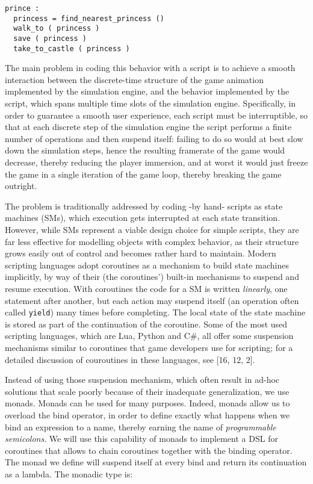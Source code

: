 \begin{lstlisting}
prince :
  princess = find_nearest_princess ()
  walk_to ( princess )
  save ( princess )
  take_to_castle ( princess )
\end{lstlisting}

The main problem in coding this behavior with a script is to achieve a smooth interaction between the discrete-time structure of the game animation implemented by the simulation engine, and the behavior implemented by the script, which spans multiple time slots of the simulation engine. Specifically, in order to guarantee a smooth user experience, each script must be interruptible, so that at each discrete step of the simulation engine the script performs a finite number of operations and then suspend itself: failing to do so would at best slow down the simulation steps, hence the resulting framerate of the game would decrease, thereby reducing the player immersion, and at worst it would just freeze the game in a single iteration of the game loop, thereby breaking the game outright.

The problem is traditionally addressed by coding -by hand- scripts as state machines (SMs), which execution gets interrupted at each state transition. However, while SMs represent a viable design choice for simple scripts, they are far less effective for modelling objects with complex behavior, as their structure grows easily out of control and becomes rather hard to maintain. Modern scripting languages adopt coroutines as a mechanism to build state machines implicitly, by way of their (the coroutines') built-in mechanisms to suspend and resume execution. With coroutines the code for a SM is written \textit{linearly}, one statement after another, but each action may suspend itself (an operation often called \texttt{yield}) many times before completing. The local state of the state machine is stored as part of the continuation of the coroutine. Some of the most used scripting languages, which are Lua, Python and C\#, all offer some suspension mechanisms similar to coroutines that game developers use for scripting; for a detailed discussion of couroutines in these languages, see [16, 12, 2].

Instead of using those suspension mechanism, which often result in ad-hoc solutions that scale poorly because of their inadequate generalization, we use monads. Monads can be used for many purposes. Indeed, monads allow us to overload the bind operator, in order to define exactly what happens when we bind an expression to a name, thereby earning the name of \textit{programmable semicolons}. We will use this capability of monads to implement a DSL for coroutines that allows to chain coroutines together with the binding operator. The monad we define will suspend itself at every bind and return its continuation as a lambda. The monadic type is:

